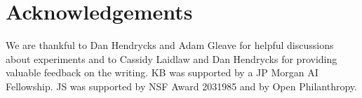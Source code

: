 \section*{Acknowledgements}
We are thankful to Dan Hendrycks and Adam Gleave for helpful discussions about experiments and to Cassidy Laidlaw and Dan Hendrycks for providing valuable feedback on the writing. KB was supported by a JP Morgan AI Fellowship. JS was supported by NSF Award 2031985 and by Open Philanthropy.